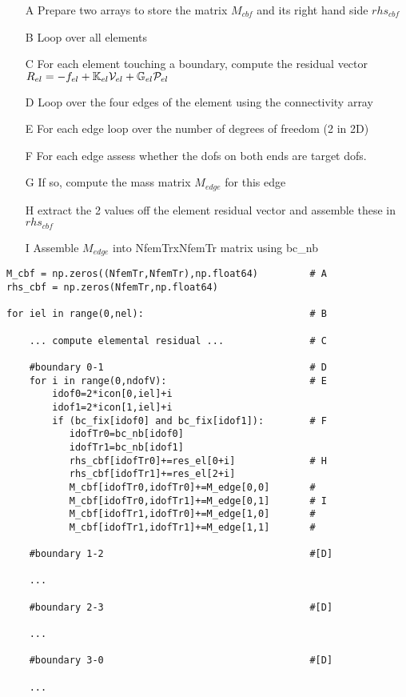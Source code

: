 \begin{itemize}
\item[A] Prepare two arrays to store the matrix $M_{cbf}$ and its right hand side $rhs_{cbf}$  

\item[B] 
Loop over all elements 

\item[C] 
For each element touching a boundary, compute the residual vector 
$R_{el}=-f_{el} + {\mathbb{K}}_{el}{\cal V}_{el} + {\mathbb{G}}_{el} {\cal P}_{el}$

\item[D]
Loop over the four edges of the element using the connectivity array

\item[E]
For each edge loop over the number of degrees of freedom (2 in 2D)

\item[F] 
For each edge assess whether the dofs on both ends are target dofs. 

\item[G]
If so, compute the mass matrix $M_{edge}$ for this edge 

\item[H] extract the 2 values off the element residual vector and assemble these
in $rhs_{cbf}$

\item[I] Assemble $M_{edge}$ into NfemTrxNfemTr matrix using bc\_nb
\end{itemize}


\begin{lstlisting}
M_cbf = np.zeros((NfemTr,NfemTr),np.float64)         # A
rhs_cbf = np.zeros(NfemTr,np.float64)

for iel in range(0,nel):                             # B

    ... compute elemental residual ...               # C

    #boundary 0-1                                    # D
    for i in range(0,ndofV):                         # E
        idof0=2*icon[0,iel]+i
        idof1=2*icon[1,iel]+i
        if (bc_fix[idof0] and bc_fix[idof1]):        # F
           idofTr0=bc_nb[idof0]   
           idofTr1=bc_nb[idof1]
           rhs_cbf[idofTr0]+=res_el[0+i]             # H
           rhs_cbf[idofTr1]+=res_el[2+i]              
           M_cbf[idofTr0,idofTr0]+=M_edge[0,0]       # 
           M_cbf[idofTr0,idofTr1]+=M_edge[0,1]       # I
           M_cbf[idofTr1,idofTr0]+=M_edge[1,0]       # 
           M_cbf[idofTr1,idofTr1]+=M_edge[1,1]       #

    #boundary 1-2                                    #[D]

    ...

    #boundary 2-3                                    #[D]

    ...

    #boundary 3-0                                    #[D]

    ...


\end{lstlisting}








